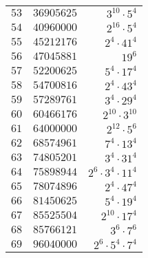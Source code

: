 \begin{center}
\begin{tabular} {|rr|r}
 $53$ & $36905625$ &           $3^{10}\cdot5^{4}$ \\
 $54$ & $40960000$ &           $2^{16}\cdot5^{4}$ \\
 $55$ & $45212176$ &           $2^{4}\cdot41^{4}$ \\
 $56$ & $47045881$ &                     $19^{6}$ \\
 $57$ & $52200625$ &           $5^{4}\cdot17^{4}$ \\
 $58$ & $54700816$ &           $2^{4}\cdot43^{4}$ \\
 $59$ & $57289761$ &           $3^{4}\cdot29^{4}$ \\
 $60$ & $60466176$ &          $2^{10}\cdot3^{10}$ \\
 $61$ & $64000000$ &           $2^{12}\cdot5^{6}$ \\
 $62$ & $68574961$ &           $7^{4}\cdot13^{4}$ \\
 $63$ & $74805201$ &           $3^{4}\cdot31^{4}$ \\
 $64$ & $75898944$ & $2^{6}\cdot3^{4}\cdot11^{4}$ \\
 $65$ & $78074896$ &           $2^{4}\cdot47^{4}$ \\
 $66$ & $81450625$ &           $5^{4}\cdot19^{4}$ \\
 $67$ & $85525504$ &          $2^{10}\cdot17^{4}$ \\
 $68$ & $85766121$ &            $3^{6}\cdot7^{6}$ \\
 $69$ & $96040000$ &  $2^{6}\cdot5^{4}\cdot7^{4}$  
\end{tabular}
\end{center}
